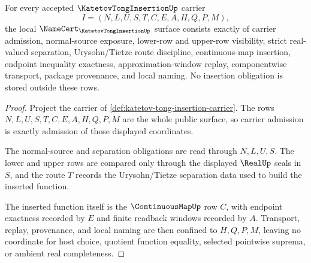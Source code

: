 \begin{theorem}
\label{thm:katetov-tong-insertion-namecert-obligations}
For every accepted $\KatetovTongInsertionUp$ carrier
$$
I=(N,L,U,S,T,C,E,A,H,Q,P,M),
$$
the local $\NameCert_{\KatetovTongInsertionUp}$ surface consists exactly of carrier admission, normal-source exposure, lower-row and upper-row visibility, strict real-valued separation, Urysohn/Tietze route discipline, continuous-map insertion, endpoint inequality exactness, approximation-window replay, componentwise transport, package provenance, and local naming. No insertion obligation is stored outside these rows.
\end{theorem}
\begin{proof}
Project the carrier of \autoref{def:katetov-tong-insertion-carrier}. The rows $N,L,U,S,T,C,E,A,H,Q,P,M$ are the whole public surface, so carrier admission is exactly admission of those displayed coordinates.

The normal-source and separation obligations are read through $N,L,U,S$. The lower and upper rows are compared only through the displayed $\RealUp$ seals in $S$, and the route $T$ records the Urysohn/Tietze separation data used to build the inserted function.

The inserted function itself is the $\ContinuousMapUp$ row $C$, with endpoint exactness recorded by $E$ and finite readback windows recorded by $A$. Transport, replay, provenance, and local naming are then confined to $H,Q,P,M$, leaving no coordinate for host choice, quotient function equality, selected pointwise suprema, or ambient real completeness.
\end{proof}


